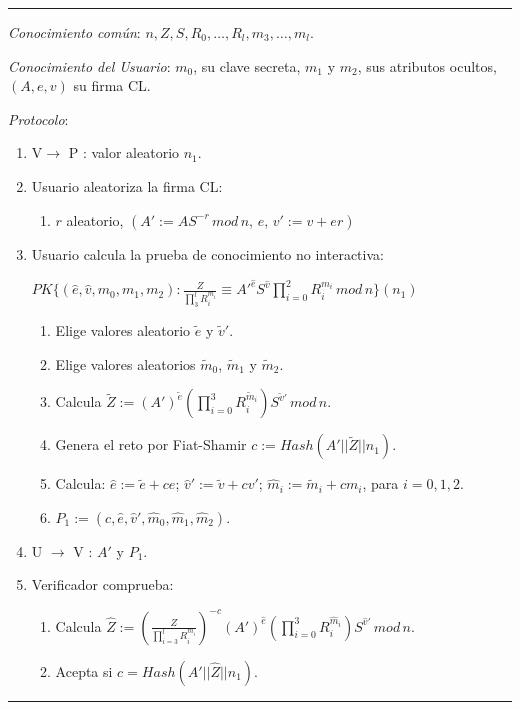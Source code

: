 \rule{\textwidth}{1pt}
\begin{algorithm}
	\hfil
	
	\textit{Conocimiento común}: $n,Z,S,R_0,\dots,R_{l},m_3,\dots,m_l$.
	
	\textit{Conocimiento del Usuario}: $m_0$, su clave secreta, $m_1$ y $m_2$, sus atributos ocultos, $(A,e,v)$ su firma CL.
	
	\textit{Protocolo}:
	\begin{enumerate}
		\item V$\rightarrow$ P : valor aleatorio $n_1$.
		
		\item Usuario aleatoriza la firma CL:
		\begin{enumerate}[label*=\arabic*.]
			
			\item $r$ aleatorio, $(A':=AS^{-r}\,mod\, n,\, e,\, v':=v+er)$
			
		\end{enumerate}
		
		\item Usuario calcula la prueba de conocimiento no interactiva:
		
		$PK\{ (\hat{e},\hat{v}, m_0, m_1, m_2) :  \frac{Z}{\prod_{3}^{l}R_i^{m_i}} \equiv A'^{\hat{e}} S^{\hat{v}}\prod_{i=0}^{2} R_i^{m_i} \, mod \, n  \}(n_1)$
		
		\begin{enumerate}[label*=\arabic*.]
			\item Elige valores aleatorio $\tilde{e}$ y $\tilde{v}'$.
			\item Elige valores aleatorios $\tilde{m}_0$, $\tilde{m}_1$ y $\tilde{m}_2$.
			\item Calcula $\tilde{Z}:=(A')^{\tilde{e}} \left( \prod_{i=0}^3 R_i^{\tilde{m}_i} \right) S^{\tilde{v}'} \, mod \, n $.
			\item Genera el reto por Fiat-Shamir $c:=Hash(A'||\tilde{Z}||n_1)$.
			\item Calcula: $\hat{e}:=\tilde{e}+ce$;\; $\hat{v}':=\tilde{v}+cv'$;\; $\hat{m}_i:=\tilde{m}_i+cm_i$, para $i=0,1,2$.
			\item $P_1:=(c, \hat{e}, \hat{v}', \hat{m}_0, \hat{m}_1, \hat{m}_2)$.			
		\end{enumerate}
		
		\item U $\rightarrow$ V : $A'$ y $P_1$.
		
		\item Verificador comprueba:
		 \begin{enumerate}[label*=\arabic*.]
		 	\item Calcula $\hat{Z}:= \left( \frac{Z}{\prod_{i=3}^{l} R_i^{m_i}} \right)^{-c} (A')^{\hat{e}} \left( \prod_{i=0}^{3} R_i^{\hat{m}_i} \right)  S^{\hat{v}'} \, mod \, n$.
		 	\item Acepta si $c=Hash(A'||\hat{Z}||n_1)$.
		 \end{enumerate}
		
	\end{enumerate}
	

\end{algorithm}
\rule{\textwidth}{1pt}


